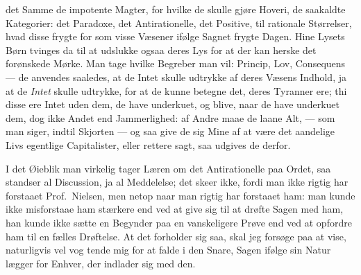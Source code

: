 det Samme de impotente Magter, for hvilke de skulle gjøre Hoveri, de saakaldte
Kategorier: det Paradoxe, det Antirationelle, det Positive, til rationale
Størrelser, hvad disse frygte for som visse Væsener ifølge Sagnet frygte Dagen.
Hine Lysets Børn tvinges da til at udslukke ogsaa deres Lys for at der kan
herske det forønskede Mørke. Man tage hvilke Begreber man vil: Princip, Lov,
Consequens --- de anvendes saaledes, at de Intet skulle udtrykke af deres
Væsens Indhold, ja at de \emph{Intet} skulle udtrykke, for at de kunne betegne
det, deres Tyranner ere; thi disse ere Intet uden dem, de have underkuet, og
blive, naar de have underkuet dem, dog ikke Andet end Jammerlighed: af Andre
maae de laane Alt, --- som man siger, indtil Skjorten --- og saa give de sig
Mine af at være det aandelige Livs
egentlige Capitalister, eller rettere sagt, saa udgives de derfor.

I det Øieblik man virkelig tager Læren om det Antirationelle paa Ordet, saa
standser al Discussion, ja al Meddelelse; det skeer ikke, fordi man ikke rigtig
har forstaaet Prof.\ Nielsen, men netop naar man rigtig har forstaaet ham: man
kunde ikke misforstaae ham stærkere end ved at give sig til at drøfte Sagen med
ham, han kunde ikke sætte en Begynder paa en vanskeligere Prøve end ved at
opfordre ham til en fælles Drøftelse. At det forholder sig saa, skal jeg
forsøge paa at vise, naturligvis vel vog\-%
tende mig for at falde i den Snare, Sagen ifølge sin Natur lægger for
Enhver, der indlader sig med den.

